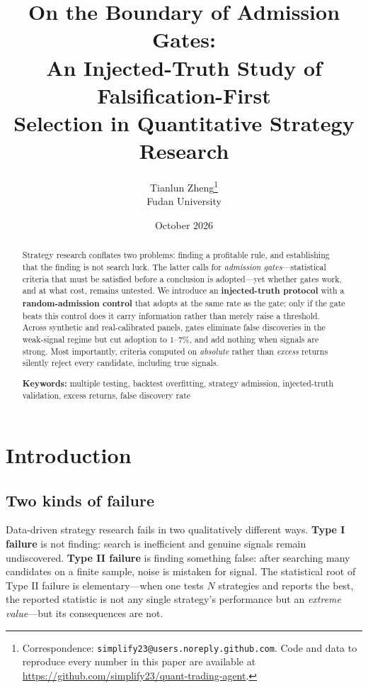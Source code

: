 \documentclass[11pt]{article}
\title{\bfseries On the Boundary of Admission Gates:\\ An Injected-Truth Study of Falsification-First\\ Selection in Quantitative Strategy Research}
\author{%
  Tianlun Zheng\thanks{Correspondence: \texttt{simplify23@users.noreply.github.com}. %
Code and data to reproduce every number in this paper are available at %
\url{https://github.com/simplify23/quant-trading-agent}.}\\[4pt]
  \small Fudan University%
}
\date{October 2026}
\begin{document}
\sloppy
\maketitle

\begin{abstract}
\noindent
Strategy research conflates two problems: finding a profitable rule, and establishing that
the finding is not search luck. The latter calls for \emph{admission gates}---statistical
criteria that must be satisfied before a conclusion is adopted---yet whether gates work, and
at what cost, remains untested. We introduce an \textbf{injected-truth protocol} with a
\textbf{random-admission control} that adopts at the same rate as the gate; only if the gate
beats this control does it carry information rather than merely raise a threshold. Across
synthetic and real-calibrated panels, gates eliminate false discoveries in the weak-signal
regime but cut adoption to $1$--$7\%$, and add nothing when signals are strong. Most
importantly, criteria computed on \emph{absolute} rather than \emph{excess} returns silently
reject every candidate, including true signals.

\vspace{4pt}
\noindent\textbf{Keywords:} multiple testing, backtest overfitting, strategy admission,
injected-truth validation, excess returns, false discovery rate
\end{abstract}

\section{Introduction}
\label{sec:intro}

\subsection{Two kinds of failure}

Data-driven strategy research fails in two qualitatively different ways. \textbf{Type I
failure} is not finding: search is inefficient and genuine signals remain undiscovered.
\textbf{Type II failure} is finding something false: after searching many candidates on a
finite sample, noise is mistaken for signal. The statistical root of Type II failure is
elementary---when one tests $N$ strategies and reports the best, the reported statistic is not
any single strategy's performance but an \emph{extreme value}---but its consequences are not.
\end{document}
